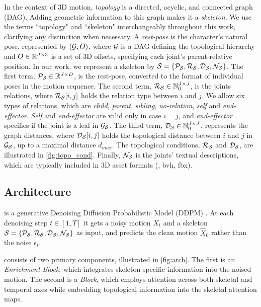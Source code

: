 In the context of 3D motion, \emph{topology} is a directed, acyclic, and connected graph (DAG). Adding geometric information to this graph makes it a \emph{skeleton}. 
We use the terms ``topology" and ``skeleton" interchangeably throughout this work, clarifying any distinction when necessary.
A \emph{rest-pose} is the character's natural pose, represented by $(\mathcal{G}, O)$, where $\mathcal{G}$ is a DAG defining the topological hierarchy and $O\in \mathbb{R}^{J\times 3}$ is a set of 3D offsets, specifying each joint's parent-relative position.
In our work, we represent a skeleton by $\mathcal{S} = \{\mathcal{P}_{\mathcal{S}}, \mathcal{R}_{\mathcal{S}}, \mathcal{D}_{\mathcal{S}}, \mathcal{N}_{\mathcal{S}}\}$. The first term, $\mathcal{P}_{\mathcal{S}} \in \mathbb{R}^{J \times D}$, is the rest-pose, converted to the format of individual poses in the motion sequence. The second term, $\mathcal{R}_{\mathcal{S}}\in \mathbb{N}_0^{J\times J}$, is the joints relations, where $\mathcal{R}_{\mathcal{S}}[i, j]$ holds the relation type between $i$ and $j$. We allow six types of relations, which are \emph{child}, \emph{parent}, \emph{sibling}, \emph{no-relation}, \emph{self} and \emph{end-effector}. \emph{Self} and \emph{end-effector} are valid only in case $i=j$, and \emph{end-effector} specifies if the joint is a leaf in $\mathcal{G}_{\mathcal{S}}$. 
The third term, $\mathcal{D}_{\mathcal{S}}\in \mathbb{N}_0^{J\times J}$, represents the graph distances, where $\mathcal{D}_{\mathcal{S}}[i,j]$ holds the topological distance between $i$ and $j$ in $\mathcal{G}_{\mathcal{S}}$, up to a maximal distance $d_{max}$. 
The topological conditions, $\mathcal{R}_{\mathcal{S}}$ and $\mathcal{D}_{\mathcal{S}}$, are illustrated in \cref{fig:topo_cond}.
Finally, $\mathcal{N}_{\mathcal{S}}$ is the joints' textual descriptions, which are typically included in 3D asset formats (\eg, bvh, fbx). 

\subsection{Architecture}

\algoname is a generative Denoising Diffusion Probabilistic Model (DDPM) \cite{ho2020denoising}.
At each denoising step $t \in [1,T]$ it gets a noisy motion $X_t$ and a skeleton $\mathcal{S}=\{\mathcal{P}_{\mathcal{S}}, \mathcal{R}_{\mathcal{S}}, \mathcal{D}_{\mathcal{S}}, \mathcal{N}_{\mathcal{S}}\}$ as input, and predicts the clean motion $\hat{X}_{0}$ \cite{tevet2023human} rather than the noise $\epsilon_t$.

\algoname consists of two primary components, illustrated in \cref{fig:arch}. The first is an \emph{Enrichment Block}, which integrates skeleton-specific information into the noised motion. The second is a \emph{\Stt Block}, which employs attention across both skeletal and temporal axes while embedding topological information into the skeletal attention maps.






